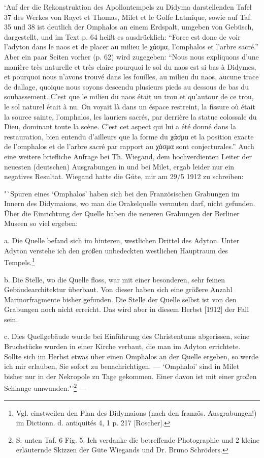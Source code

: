 \documentclass[a4paper, 11pt, oneside]{article}
\begin{document}
`Auf der die Rekonstruktion des Apollontempels zu Didyma darstellenden Tafel 37 des Werkes von Rayet et Thomas, Milet et le Golfe Latmique, sowie auf Taf. 35 und 38 ist deutlich der Omphalos an einem Erdspalt, umgeben von Gebüsch, dargestellt, und im Text p. 64 heißt es ausdrücklich: "`Force est donc de voir l'adyton dans le naos et de placer au milieu le χάσμα, l'omphalos et l'arbre sacré."' Aber ein paar Seiten vorher (p. 62) wird zugegeben: "`Nous nous expliquons d'une manière très naturelle et très claire pourquoi le sol du naos est si bas à Didymes, et pourquoi nous n'avons trouvé dans les fouilles, au milieu du naos, aucune trace de dallage, quoique nous soyons descendu plusieurs pieds au dessous de bas du soubassement. C'est que le milieu du naos était un trou et qu'autour de ce trou, le sol naturel était à nu. On voyait là dans un éspace restreint, la fissure où était la source sainte, l'omphalos, les lauriers sacrés, par derrière la statue colossale du Dieu, dominant toute la scène. C'est cet aspect qui lui a été donné dans la restauration, bien entendu d'ailleurs que la forme du χάσμα et la position exacte de l'omphalos et de l'arbre sacré par rapport au χάσμα sont conjecturales."' Auch eine weitere briefliche Anfrage bei Th. Wiegand, dem hochverdienten Leiter der neuesten (deutschen) Ausgrabungen in und bei Milet, ergab leider nur ein negatives Resultat. Wiegand hatte die Güte, mir am 29/5 1912 zu schreiben:

"`Spuren eines `Omphalos' haben sich bei den Französischen Grabungen im Innern des Didymaions, wo man die Orakelquelle vermuten darf, nicht gefunden. Über die Einrichtung der Quelle haben die neueren Grabungen der Berliner Museen so viel ergeben:

a. Die Quelle befand sich im hinteren, westlichen Drittel des Adyton. Unter Adyton verstehe ich den großen unbedeckten westlichen Hauptraum des Tempels.\footnote{Vgl. einstweilen den Plan des Didymaions (nach den französ. Ausgrabungen!) im Dictionn. d. antiquités 4, 1 p. 217 [Roscher].}

b. Die Stelle, wo die Quelle floss, war mit einer besonderen, sehr feinen Gebäudearchitektur überbaut. Von dieser haben sich eine größere Anzahl Marmorfragmente bisher gefunden. Die Stelle der Quelle selbst ist von den Grabungen noch nicht erreicht. Das wird aber in diesem Herbst [1912] der Fall sein.

c. Dies Quellgebäude wurde bei Einführung des Christentums abgerissen, seine Bruchstücke wurden in einer Kirche verbaut, die man im Adyton errichtete. Sollte sich im Herbst etwas über einen Omphalos an der Quelle ergeben, so werde ich mir erlauben, Sie sofort zu benachrichtigen. --- `Omphaloi' sind in Milet bisher nur in der Nekropole zu Tage gekommen. Einer davon ist mit einer großen Schlange umwunden."'\footnote{S. unten Taf. 6 Fig. 5. Ich verdanke die betreffende Photographie und 2 kleine erläuternde Skizzen der Güte Wiegands und Dr. Bruno Schröders.} ---
\end{document}
